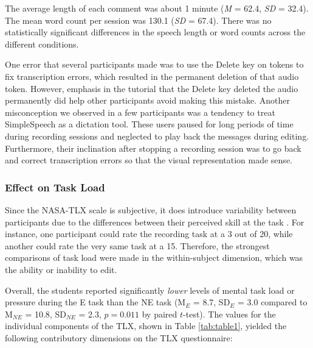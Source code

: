 The average length of each comment was about 1 minute (\textit{M} = 62.4, \textit{SD} = 32.4). The mean word count per session was 130.1 (\textit{SD} = 67.4). There was no statistically significant differences in the speech length or word counts across the different conditions.

One error that several participants made was to use the Delete key on tokens to fix transcription errors, which resulted in the permanent deletion of that audio token. 
However, emphasis in the tutorial that the Delete key deleted the audio permanently did help other participants avoid making this mistake.
Another misconception we observed in a few participants was a tendency to treat SimpleSpeech as a dictation tool. 
These users paused for long periods of time during recording sessions and neglected to play back the messages during editing. 
Furthermore, their inclination after stopping a recording session was to go back and correct transcription errors so that the visual representation made sense.

\subsubsection{Effect on Task Load}
Since the NASA-TLX scale is subjective, it does introduce variability between participants due to the differences between their perceived skill at the task \cite{nasatlx}. 
For instance, one participant could rate the recording task at a 3 out of 20, while another could rate the very same task at a 15.
Therefore, the strongest comparisons of task load were made in the within-subject dimension, which was the ability or inability to edit.

Overall, the students reported significantly \emph{lower} levels of mental task load or pressure during the E task than the NE task (M$_{E}$ = 8.7, SD$_{E}$ = 3.0 compared to M$_{NE}$ = 10.8, SD$_{NE}$ = 2.3, $p=0.011$ by paired $t$-test). 
The values for the individual components of the TLX, shown in Table \ref{tab:table1}, yielded the following contributory dimensions on the TLX questionnaire:

